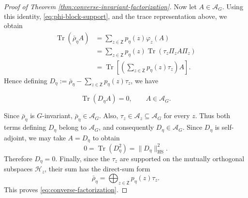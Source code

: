 \documentclass{article}
\theoremstyle{named}
\theoremstyle{named1}
\newcommand{\Tr}{\operatorname{Tr}}
\newcommand{\cA}{\mathcal A}
\newcommand{\cH}{\mathcal H}
\theoremstyle{plain}
\theoremstyle{remark}
\begin{document}
\begin{proof}[Proof of Theorem \ref{thm:converse-invariant-factorization}]
Now let $A\in\cA_G$. Using this identity,
\eqref{eq:phi-block-support}, and the trace
representation above, we obtain
\begin{align*}
    \Tr(\bar\rho_\eta A)
    &=
    \sum_{z\in\mathsf Z}
    p_\eta(z)\varphi_z(A)\\
    &=
    \sum_{z\in\mathsf Z}
    p_\eta(z)
    \Tr\!\left(\tau_z\Pi_zA\Pi_z\right)\\
    &=
    \Tr\!\left[
        \left(
            \sum_{z\in\mathsf Z}p_\eta(z)\tau_z
        \right)A
    \right].
\end{align*}
Hence defining $D_\eta
    :=
    \bar\rho_\eta
    -
    \sum_{z\in\mathsf Z}p_\eta(z)\tau_z$, we have
    
\[
    \Tr(D_\eta A)=0,
    \qquad A\in\cA_G.
\]

Since $\bar\rho_\eta$ is $G$-invariant,
$\bar\rho_\eta\in\cA_G$. Also,
$\tau_z\in\cA_z\subseteq\cA_G$ for every $z$.
Thus both terms defining $D_\eta$ belong to $\cA_G$,
and consequently $D_\eta\in\cA_G$.
Since $D_\eta$ is self-adjoint, we may take
$A=D_\eta$ to obtain
\[
    0
    =
    \Tr(D_\eta^2)
    =
    \|D_\eta\|_{\mathrm{HS}}^2.
\]
Therefore $D_\eta=0$. Finally, since the $\tau_z$
are supported on the mutually orthogonal subspaces
$\cH_z$, their sum has the direct-sum form
\[
    \bar\rho_\eta
    =
    \bigoplus_{z\in\mathsf Z}p_\eta(z)\tau_z.
\]
This proves \eqref{eq:converse-factorization}.
\end{proof}
\end{document}
